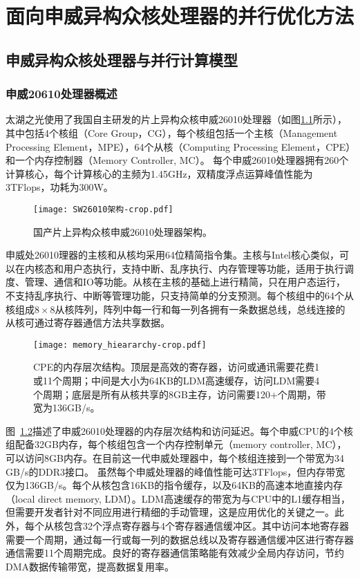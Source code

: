 \chapter{面向申威异构众核处理器的并行优化方法} %
\label{cha:面向申威异构众核处理器的并行优化方法}

\section{申威异构众核处理器与并行计算模型} %

\subsection{申威20610处理器概述} %
\label{sub:申威20610处理器概述}

太湖之光使用了我国自主研发的片上异构众核申威26010处理器（如图\ref{fig:sunwaycpu}所示），其中包括4个核组（Core Group，CG）\citep {fu2016sunway}，每个核组包括一个主核（Management Processing Element，MPE），64个从核（Computing Processing Element，CPE）和一个内存控制器（Memory Controller, MC）。 每个申威26010处理器拥有260个计算核心，每个计算核心的主频为1.45GHz，双精度浮点运算峰值性能为3TFlops，功耗为300W。

\begin{figure}[ht]
\centering
\texttt{[image: SW26010架构-crop.pdf]}
\caption{国产片上异构众核申威26010处理器架构。}
\label{fig:sunwaycpu}
\end{figure}

申威处26010理器的主核和从核均采用64位精简指令集。主核与Intel核心类似，可以在内核态和用户态执行，支持中断、乱序执行、内存管理等功能，适用于执行调度、管理、通信和IO等功能。从核在主核的基础上进行精简，只在用户态运行，不支持乱序执行、中断等管理功能，只支持简单的分支预测。每个核组中的64个从核组成$8\times8$从核阵列，阵列中每一行和每一列各拥有一条数据总线，总线连接的从核可通过寄存器通信方法共享数据。

\begin{figure}[ht]
\centering
\texttt{[image: memory\_hieararchy-crop.pdf]}
\caption{CPE的内存层次结构。顶层是高效的寄存器，访问或通讯需要花费1或11个周期；中间是大小为64KB的LDM高速缓存，访问LDM需要4个周期；底层是所有从核共享的8GB主存，访问需要120+个周期，带宽为136GB/s。}
\label{fig:sunway_mem}
\end{figure}

图~\ref {fig:sunway_mem}描述了申威26010处理器的内存层次结构和访问延迟。每个申威CPU的4个核组配备32GB内存，每个核组包含一个内存控制单元（memory controller, MC），可以访问8GB内存。在目前这一代申威处理器中，每个核组连接到一个带宽为34 GB/s的DDR3接口。 虽然每个申威处理器的峰值性能可达3TFlops，但内存带宽仅为136GB/s。每个从核包含16KB的指令缓存，以及64KB的高速本地直接内存（local direct memory, LDM）。LDM高速缓存的带宽为与CPU中的L1缓存相当，但需要开发者针对不同应用进行精细的手动管理，这是应用优化的关键之一。此外，每个从核包含32个浮点寄存器与4个寄存器通信缓冲区。其中访问本地寄存器需要一个周期，通过每一行或每一列的数据总线以及寄存器通信缓冲区进行寄存器通信需要11个周期完成。良好的寄存器通信策略能有效减少全局内存访问，节约DMA数据传输带宽，提高数据复用率。


